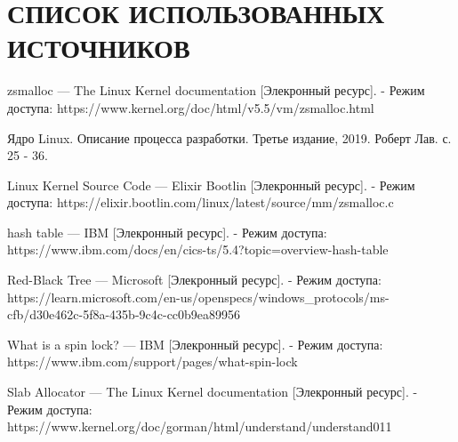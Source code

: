 \section*{СПИСОК ИСПОЛЬЗОВАННЫХ ИСТОЧНИКОВ}

\begingroup
\renewcommand{\section}[2]{}
\begin{thebibliography}{}
	zsmalloc — The Linux Kernel documentation [Элекронный ресурс]. - Режим доступа:
	https://www.kernel.org/doc/html/v5.5/vm/zsmalloc.html
	
	Ядро Linux. Описание процесса разработки. Третье издание, 2019. Роберт Лав. с. 25 - 36.
	
	Linux Kernel Source Code — Elixir Bootlin [Элекронный ресурс]. - Режим доступа:
	https://elixir.bootlin.com/linux/latest/source/mm/zsmalloc.c
	
	hash table — IBM [Элекронный ресурс]. - Режим доступа:
	https://www.ibm.com/docs/en/cics-ts/5.4?topic=overview-hash-table
	
	Red-Black Tree — Microsoft [Элекронный ресурс]. - Режим доступа:
	https://learn.microsoft.com/en-us/openspecs/windows\_protocols/ms-cfb/d30e462c-5f8a-435b-9c4c-cc0b9ea89956
	
	What is a spin lock?  — IBM [Элекронный ресурс]. - Режим доступа:
	https://www.ibm.com/support/pages/what-spin-lock
	
	 Slab Allocator —  The Linux Kernel documentation [Элекронный ресурс]. - Режим доступа:
	https://www.kernel.org/doc/gorman/html/understand/understand011
\end{thebibliography}
\endgroup

\pagebreak